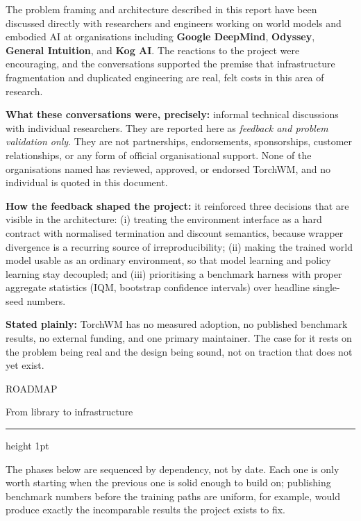 \documentclass[10pt,a4paper]{article}
\newcommand{\kicker}[1]{{\footnotesize\displayfont\color{accent}\MakeUppercase{#1}}}
\newcommand{\pagetitle}[2]{%
  \kicker{#1}\par\vspace{1.5mm}
  {\Huge\displayfont\color{ink} #2}\par\vspace{2.5mm}
  {\color{rule}\hrule height 1pt}\par\vspace{4mm}}
\begin{document}
\begin{callout}
{\footnotesize
The problem framing and architecture described in this report have been discussed directly with
researchers and engineers working on world models and embodied AI at organisations including
\textbf{Google DeepMind}, \textbf{Odyssey}, \textbf{General Intuition}, and \textbf{Kog AI}. The
reactions to the project were encouraging, and the conversations supported the premise that
infrastructure fragmentation and duplicated engineering are real, felt costs in this area of
research.
\vspace{2mm}

\textbf{What these conversations were, precisely:} informal technical discussions with individual
researchers. They are reported here as \emph{feedback and problem validation only}. They are not
partnerships, endorsements, sponsorships, customer relationships, or any form of official
organisational support. None of the organisations named has reviewed, approved, or endorsed
TorchWM, and no individual is quoted in this document.
\vspace{2mm}

\textbf{How the feedback shaped the project:} it reinforced three decisions that are visible in the
architecture: (i) treating the environment interface as a hard contract with normalised
termination and discount semantics, because wrapper divergence is a recurring source of
irreproducibility; (ii) making the trained world model usable as an ordinary environment, so that
model learning and policy learning stay decoupled; and (iii) prioritising a benchmark harness with
proper aggregate statistics (IQM, bootstrap confidence intervals) over headline single-seed
numbers.}
\end{callout}

\vspace{3mm}
\begin{warncallout}
{\footnotesize\textbf{Stated plainly:} TorchWM has no measured adoption, no published benchmark
results, no external funding, and one primary maintainer. The case for it rests on the problem
being real and the design being sound, not on traction that does not yet exist.}
\end{warncallout}

\newpage
\pagetitle{Roadmap}{From library to infrastructure}

{\footnotesize
The phases below are sequenced by dependency, not by date. Each one is only worth starting when the
previous one is solid enough to build on; publishing benchmark numbers before the training paths are
uniform, for example, would produce exactly the incomparable results the project exists to fix.}
\end{document}
